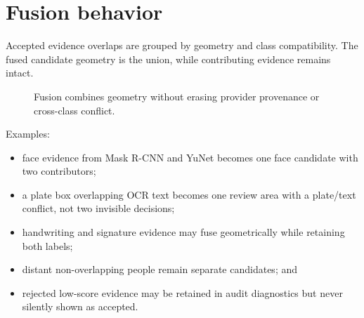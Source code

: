 \section{Fusion behavior}

Accepted evidence overlaps are grouped by geometry and class compatibility. The fused candidate geometry is the union, while contributing evidence remains intact.

\begin{figure}[htbp]
\centering
{}
\caption{Fusion combines geometry without erasing provider provenance or cross-class conflict.}
\end{figure}

Examples:

\begin{itemize}[leftmargin=6mm]
  \item face evidence from Mask R-CNN and YuNet becomes one face candidate with two contributors;
  \item a plate box overlapping OCR text becomes one review area with a plate/text conflict, not two invisible decisions;
  \item handwriting and signature evidence may fuse geometrically while retaining both labels;
  \item distant non-overlapping people remain separate candidates; and
  \item rejected low-score evidence may be retained in audit diagnostics but never silently shown as accepted.
\end{itemize}

